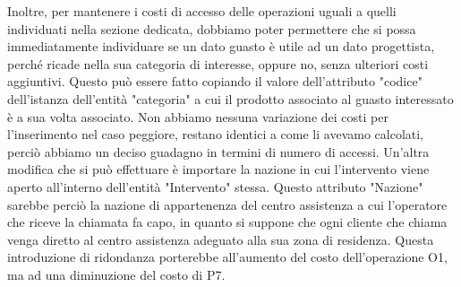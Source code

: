 \documentclass[a4paper, 12pt]{report}
\begin{document}
Inoltre, per mantenere i costi di accesso delle operazioni uguali a quelli individuati nella sezione dedicata, dobbiamo poter permettere che si possa immediatamente
individuare se un dato guasto è utile ad un dato progettista, perché ricade nella sua categoria di interesse, oppure no, senza ulteriori costi aggiuntivi. Questo può essere fatto
copiando il valore dell'attributo "codice" dell'istanza dell'entità "categoria" a cui il prodotto associato al guasto interessato è a sua volta associato. Non abbiamo nessuna
variazione dei costi per l'inserimento nel caso peggiore, restano identici a come li avevamo calcolati, perciò abbiamo un deciso guadagno in termini di numero di accessi.\newline
Un'altra modifica che si può effettuare è importare la nazione in cui l'intervento viene aperto all'interno dell'entità "Intervento" stessa. Questo attributo "Nazione" sarebbe perciò
la nazione di appartenenza del centro assistenza a cui l'operatore che riceve la chiamata fa capo, in quanto si suppone che ogni cliente che chiama venga diretto al centro assistenza 
adeguato alla sua zona di residenza. Questa introduzione di ridondanza porterebbe all'aumento del costo dell'operazione O1, ma ad una diminuzione del costo di P7.
\end{document}
